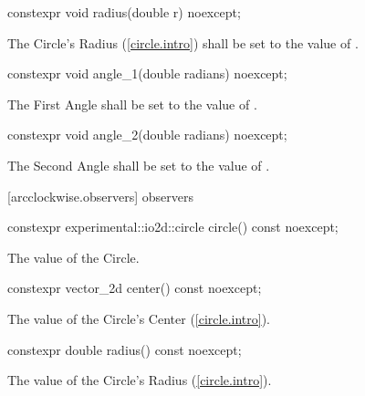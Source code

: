 \begin{itemdecl}
constexpr void radius(double r) noexcept;
\end{itemdecl}
\begin{itemdescr}
\pnum
\effects
The Circle's Radius (\ref{circle.intro}) shall be set to the value of .
\end{itemdescr}

\begin{itemdecl}
constexpr void angle_1(double radians) noexcept;
\end{itemdecl}
\begin{itemdescr}
\pnum
\effects
The First Angle shall be set to the value of .
\end{itemdescr}

\begin{itemdecl}
constexpr void angle_2(double radians) noexcept;
\end{itemdecl}
\begin{itemdescr}
\pnum
\effects
The Second Angle shall be set to the value of .
\end{itemdescr}

 [arcclockwise.observers]{ observers}

\begin{itemdecl}
constexpr experimental::io2d::circle circle() const noexcept;
\end{itemdecl}
\begin{itemdescr}
\pnum
\returns
The value of the Circle.
\end{itemdescr}

\begin{itemdecl}
constexpr vector_2d center() const noexcept;
\end{itemdecl}
\begin{itemdescr}
\pnum
\returns
The value of the Circle's Center (\ref{circle.intro}).
\end{itemdescr}

\begin{itemdecl}
constexpr double radius() const noexcept;
\end{itemdecl}
\begin{itemdescr}
\pnum
\returns
The value of the Circle's Radius (\ref{circle.intro}).
\end{itemdescr}

